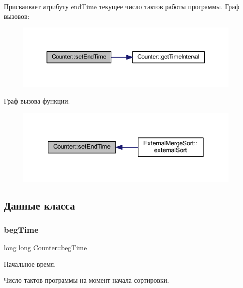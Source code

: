 Присваивает атрибуту end\+Time текущее число тактов работы программы. Граф вызовов\+:\nopagebreak
\begin{figure}[H]
\begin{center}
\leavevmode
\includegraphics[width=345pt]{class_counter_a338ac4f04d6f5924aa7ace3b14d9ffb9_cgraph}
\end{center}
\end{figure}
Граф вызова функции\+:\nopagebreak
\begin{figure}[H]
\begin{center}
\leavevmode
\includegraphics[width=328pt]{class_counter_a338ac4f04d6f5924aa7ace3b14d9ffb9_icgraph}
\end{center}
\end{figure}


\subsection{Данные класса}
\hypertarget{class_counter_ae2f8fa6947d7daa4b977d4aae2ee3c43}{}\label{class_counter_ae2f8fa6947d7daa4b977d4aae2ee3c43} 
\subsubsection{\texorpdfstring{beg\+Time}{begTime}}
{\footnotesize\ttfamily long long Counter\+::beg\+Time\hspace{0.3cm}{\ttfamily [private]}}



Начальное время. 

Число тактов программы на момент начала сортировки. \hypertarget{class_counter_a20f5a772c02412c338457dcc85c4a543}{}\label{class_counter_a20f5a772c02412c338457dcc85c4a543} 
